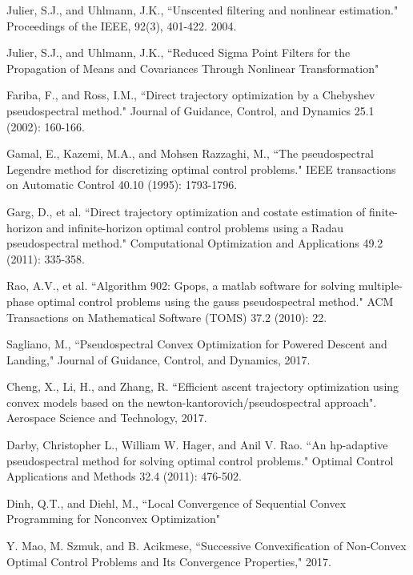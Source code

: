 \documentclass[10pt,a4paper]{article}
\begin{document}
\begin{thebibliography}{1}
		Julier, S.J., and Uhlmann, J.K., ``Unscented filtering and nonlinear estimation." Proceedings of the IEEE, 92(3), 401-422. 2004.
		
		Julier, S.J., and Uhlmann, J.K., ``Reduced Sigma Point Filters for the Propagation of Means and Covariances Through Nonlinear Transformation"
				
		Fariba, F., and Ross, I.M., ``Direct trajectory optimization by a Chebyshev pseudospectral method." Journal of Guidance, Control, and Dynamics 25.1 (2002): 160-166.
		
		Gamal, E., Kazemi, M.A., and Mohsen Razzaghi, M., ``The pseudospectral Legendre method for discretizing optimal control problems." IEEE transactions on Automatic Control 40.10 (1995): 1793-1796.
		
		Garg, D., et al. ``Direct trajectory optimization and costate estimation of finite-horizon and infinite-horizon optimal control problems using a Radau pseudospectral method." Computational Optimization and Applications 49.2 (2011): 335-358.
		
		Rao, A.V., et al. ``Algorithm 902: Gpops, a matlab software for solving multiple-phase optimal control problems using the gauss pseudospectral method." ACM Transactions on Mathematical Software (TOMS) 37.2 (2010): 22.				
				
		Sagliano, M., ``Pseudospectral Convex Optimization for Powered Descent and Landing," Journal of Guidance, Control, and Dynamics, 2017.
		
		Cheng, X., Li, H., and Zhang, R. ``Efficient ascent trajectory optimization using convex models based on the newton-kantorovich/pseudospectral approach". Aerospace Science and Technology, 2017.
		
		Darby, Christopher L., William W. Hager, and Anil V. Rao. ``An hp-adaptive pseudospectral method for solving optimal control problems." Optimal Control Applications and Methods 32.4 (2011): 476-502.
		
		Dinh, Q.T., and Diehl, M., ``Local Convergence of Sequential Convex Programming for Nonconvex Optimization"
		
		Y. Mao, M. Szmuk, and B. Acikmese, ``Successive Convexification of Non-Convex Optimal Control Problems and Its Convergence Properties," 2017.
		

\end{thebibliography}
\end{document}
